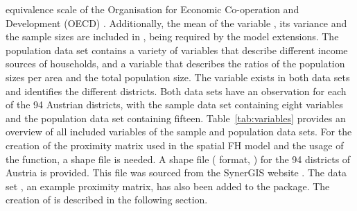 equivalence scale of the Organisation for Economic Co-operation and Development
(OECD)  \citep{Hagenaars1994}. Additionally, the mean of the variable ,
its variance and the sample sizes are included in , being required by the model extensions. The population data set 
contains a variety of variables that describe different income sources of households,
and a variable  that describes the ratios of the population sizes per area and
the total population size. The variable  exists in
both data sets and identifies the different districts. Both data sets have an observation for each of the 94 Austrian districts, with the sample data set
 containing eight variables and the population data set
 containing fifteen. Table~\ref{tab:variables} provides an overview of all
included variables of the sample and population data sets. For the creation of
the proximity matrix used in the spatial FH model and the usage of the
 function, a shape file is needed. A shape file
 ( format, )
for the 94 districts of Austria is provided. This file was sourced from the SynerGIS website
\citep{BuamtEich2017}. The data set , an example proximity matrix, has also been added
to the  package. The creation of  is described in the following section.
\vspace{-0.3cm}
